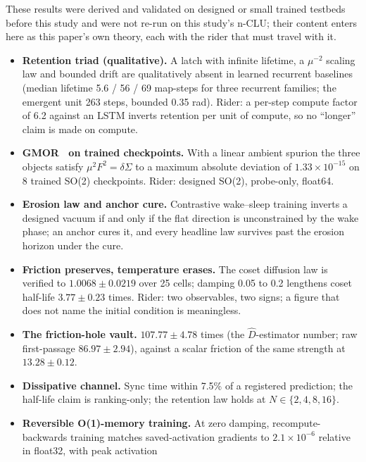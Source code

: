 \documentclass{article} %
\newcommand{\sci}[2]{\ensuremath{#1\times10^{#2}}}
\begin{document}
These results were derived and validated on designed or small trained testbeds before this study
and were not re-run on this study's n-CLU; their content enters here as this paper's own theory,
each with the rider that must travel with it. %
\begin{itemize}
\item \textbf{Retention triad (qualitative).} A latch with infinite lifetime, a $\mu^{-2}$ scaling
law and bounded drift are qualitatively absent in learned recurrent baselines (median lifetime 5.6
  / 56 / 69 map-steps for three recurrent families; the emergent unit 263 steps, bounded 0.35 rad).
  Rider: a per-step compute factor of 6.2 against an LSTM inverts retention per unit of compute, so
  no ``longer'' claim is made on compute. %
\item \textbf{GMOR~\citep{gell-mann_behavior_1968} on trained checkpoints.} With a linear ambient spurion the three objects satisfy
  $\mu^2F^2=\delta\Sigma$ to a maximum absolute deviation of \sci{1.33}{-15} on 8 trained SO(2)
  checkpoints. Rider: designed SO(2), probe-only, float64. %
\item \textbf{Erosion law and anchor cure.} Contrastive wake--sleep training inverts a designed
  vacuum if and only if the flat direction is unconstrained by the wake phase; an anchor cures it,
  and every headline law survives past the erosion horizon under the cure. %
\item \textbf{Friction preserves, temperature erases.} The coset diffusion law is verified to
  $1.0068\pm0.0219$ over 25 cells; damping 0.05 to 0.2 lengthens coset half-life
  $3.77\pm0.23$ times. Rider: two observables, two signs; a figure that does not name the initial
  condition is meaningless. %
\item \textbf{The friction-hole vault.} $107.77\pm4.78$ times (the $\hat D$-estimator number; raw
  first-passage $86.97\pm2.94$), against a scalar friction of the same strength at
  $13.28\pm0.12$. %
\item \textbf{Dissipative channel.} Sync time within 7.5\% of a registered prediction; the half-life
  claim is ranking-only; the retention law holds at $N\in\{2,4,8,16\}$. %
\item \textbf{Reversible O(1)-memory training.} At zero damping, recompute-backwards training
  matches saved-activation gradients to \sci{2.1}{-6} relative in float32, with peak activation

\end{itemize}
\end{document}
